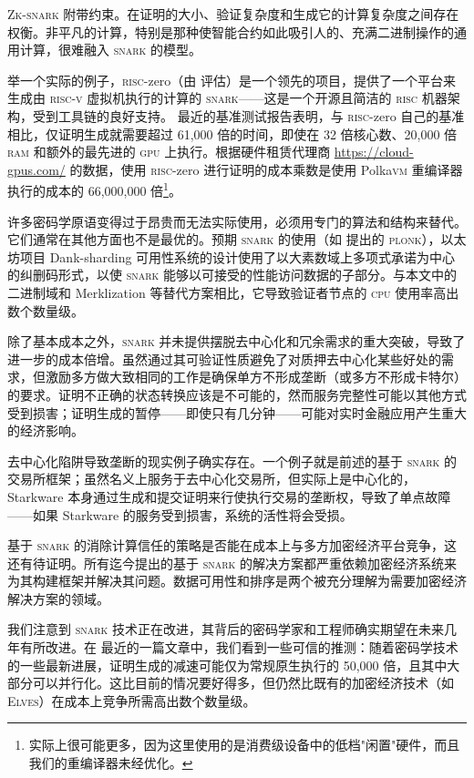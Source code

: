 \textsc{Zk-snark} 附带约束。在证明的大小、验证复杂度和生成它的计算复杂度之间存在权衡。非平凡的计算，特别是那种使智能合约如此吸引人的、充满二进制操作的通用计算，很难融入 \textsc{snark} 的模型。

举一个实际的例子，\textsc{risc}-zero（由 \cite{bogli2024assessing} 评估）是一个领先的项目，提供了一个平台来生成由 \textsc{risc-v} 虚拟机执行的计算的 \textsc{snark}——这是一个开源且简洁的 \textsc{risc} 机器架构，受到工具链的良好支持。\cite{koute2024risc0} 最近的基准测试报告表明，与 \textsc{risc}-zero 自己的基准相比，仅证明生成就需要超过 61,000 倍的时间，即使在 32 倍核心数、20,000 倍 \textsc{ram} 和额外的最先进的 \textsc{gpu} 上执行。根据硬件租赁代理商 \url{https://cloud-gpus.com/} 的数据，使用 \textsc{risc}-zero 进行证明的成本乘数是使用 Polka\textsc{vm} 重编译器执行的成本的 66,000,000 倍\footnote{实际上很可能更多，因为这里使用的是消费级设备中的低档"闲置"硬件，而且我们的重编译器未经优化。}。

许多密码学原语变得过于昂贵而无法实际使用，必须用专门的算法和结构来替代。它们通常在其他方面也不是最优的。预期 \textsc{snark} 的使用（如 \cite{cryptoeprint:2019/953} 提出的 \textsc{plonk}），以太坊项目 Dank-sharding 可用性系统的设计使用了以大素数域上多项式承诺为中心的纠删码形式，以使 \textsc{snark} 能够以可接受的性能访问数据的子部分。与本文中的二进制域和 Merklization 等替代方案相比，它导致验证者节点的 \textsc{cpu} 使用率高出数个数量级。

除了基本成本之外，\textsc{snark} 并未提供摆脱去中心化和冗余需求的重大突破，导致了进一步的成本倍增。虽然通过其可验证性质避免了对质押去中心化某些好处的需求，但激励多方做大致相同的工作是确保单方不形成垄断（或多方不形成卡特尔）的要求。证明不正确的状态转换应该是不可能的，然而服务完整性可能以其他方式受到损害；证明生成的暂停——即使只有几分钟——可能对实时金融应用产生重大的经济影响。

去中心化陷阱导致垄断的现实例子确实存在。一个例子就是前述的基于 \textsc{snark} 的交易所框架；虽然名义上服务于去中心化交易所，但实际上是中心化的，Starkware 本身通过生成和提交证明来行使执行交易的垄断权，导致了单点故障——如果 Starkware 的服务受到损害，系统的活性将会受损。

基于 \textsc{snark} 的消除计算信任的策略是否能在成本上与多方加密经济平台竞争，这还有待证明。所有迄今提出的基于 \textsc{snark} 的解决方案都严重依赖加密经济系统来为其构建框架并解决其问题。数据可用性和排序是两个被充分理解为需要加密经济解决方案的领域。

我们注意到 \textsc{snark} 技术正在改进，其背后的密码学家和工程师确实期望在未来几年有所改进。在 \cite{thaler2023technical} 最近的一篇文章中，我们看到一些可信的推测：随着密码学技术的一些最新进展，证明生成的减速可能仅为常规原生执行的 50,000 倍，且其中大部分可以并行化。这比目前的情况要好得多，但仍然比既有的加密经济技术（如 \textsc{Elves}）在成本上竞争所需高出数个数量级。

